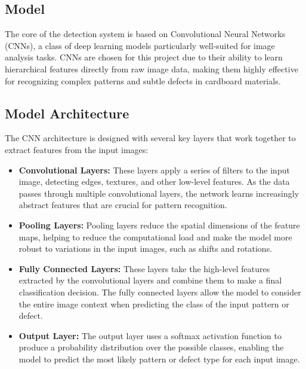 \subsection{Model}

The core of the detection system is based on Convolutional Neural Networks (CNNs), a class of deep learning models particularly well-suited for image analysis tasks. CNNs are chosen for this project due to their ability to learn hierarchical features directly from raw image data, making them highly effective for recognizing complex patterns and subtle defects in cardboard materials.


\subsection*{Model Architecture}
The CNN architecture is designed with several key layers that work together to extract features from the input images:

\begin{itemize}
	\item \textbf{Convolutional Layers:} These layers apply a series of filters to the input image, detecting edges, textures, and other low-level features. As the data passes through multiple convolutional layers, the network learns increasingly abstract features that are crucial for pattern recognition.
	\item \textbf{Pooling Layers: } Pooling layers reduce the spatial dimensions of the feature maps, helping to reduce the computational load and make the model more robust to variations in the input images, such as shifts and rotations.
	\item \textbf{Fully Connected Layers: } These layers take the high-level features extracted by the convolutional layers and combine them to make a final classification decision. The fully connected layers allow the model to consider the entire image context when predicting the class of the input pattern or defect.
	\item \textbf{Output Layer:} The output layer uses a softmax activation function to produce a probability distribution over the possible classes, enabling the model to predict the most likely pattern or defect type for each input image.
	
\end{itemize}


